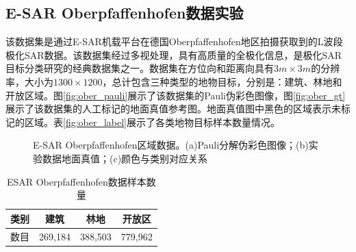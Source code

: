 \subsection{E-SAR Oberpfaffenhofen数据实验}
该数据集是通过E-SAR机载平台在德国Oberpfaffenhofen地区拍摄获取到的L波段极化SAR数据。该数据集经过多视处理，具有高质量的全极化信息，是极化SAR目标分类研究的经典数据集之一。数据集在方位向和距离向具有$3m \times 3m$的分辨率，大小为$1300 \times 1200$，总计包含三种类型的地物目标，分别是：建筑、林地和开放区域。图\ref{fig:ober_pauli}展示了该数据集的Pauli伪彩色图像，图\ref{fig:ober_gt}展示了该数据集的人工标记的地面真值参考图。地面真值图中黑色的区域表示未标记的区域。表\ref{fig:ober_label}展示了各类地物目标样本数量情况。

\begin{figure}[ht]

    \caption{E-SAR Oberpfaffenhofen区域数据。(a)Pauli分解伪彩色图像；(b)实验数据地面真值；(c)颜色与类别对应关系}
\end{figure}

\begin{table}[ht]
    \caption{ESAR Oberpfaffenhofen数据样本数量}
    \label{tab:ober_sample}
    \centering
    \begin{tabular}{|c|c|c|c|}
        \hline
        类别 & 建筑      & 林地      & 开放区     \\ \hline
        数目 & 269,184 & 388,503 & 779,962 \\ \hline
    \end{tabular}
\end{table}

